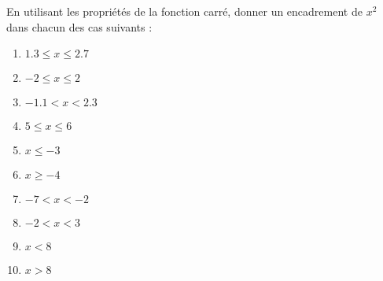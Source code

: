 
\begin{exercice}\label{exosmath-0139}

    En utilisant les propriétés de la fonction carré, donner un encadrement de \( x^2\) dans chacun des cas suivants :
    \begin{multicols}{3}
    \begin{enumerate}
        \item
            \( 1.3\leq x\leq 2.7\)
        \item
            \( -2\leq x\leq 2\)
        \item
            \( -1.1< x<2.3\)
        \item
            \( 5\leq x\leq 6\)
        \item
            \( x\leq -3\)
        \item
            \( x\geq -4\)
        \item
            \( -7<x<-2\)
        \item
            \( -2 < x < 3\)
        \item
            \( x<8\)
        \item
            \( x>8\)
    \end{enumerate}
    \end{multicols}

\end{exercice}
